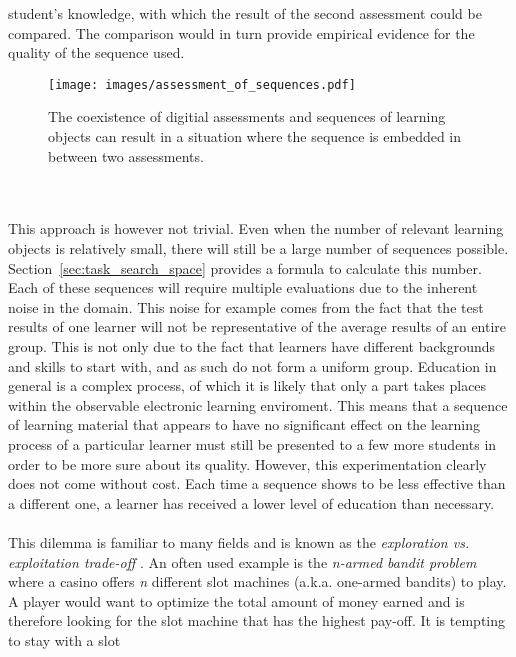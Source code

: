 student's knowledge, with which the result of the second assessment could be
compared. The comparison would in turn provide empirical evidence for the
quality of the sequence used.
\begin{figure}[h!]
	\begin{framed}
	\centering
	\texttt{[image: images/assessment\_of\_sequences.pdf]}
	\caption[Coexistence of learning objects and assessments]{The coexistence of digitial assessments and sequences of learning
	objects can result in a situation where the sequence is embedded in between
	two assessments.}
	\label{fig:assessment_of_sequences}
	\end{framed}
\end{figure}\\\\
\noindent
This approach is however not trivial. Even when the number of relevant learning
objects is relatively small, there will still be a large number of sequences
possible. Section~\ref{sec:task_search_space} provides a formula to calculate
this number. Each of these sequences will require multiple evaluations due to
the inherent noise in the domain. This noise for example comes from the fact
that the test results of one learner will not be representative of the average
results of an entire group. This is not only due to the fact that learners have
different backgrounds and skills to start with, and as such do not form a
uniform group. Education in general is a complex process, of which it is likely
that only a part takes places within the observable electronic learning
enviroment. This means that a sequence of learning material that appears to
have no significant effect on the learning process of a particular learner must
still be presented to a few more students in order to be more sure about its
quality. However, this experimentation clearly does not come without cost. Each
time a sequence shows to be less effective than a different one, a learner has
received a lower level of education than necessary.\\\\
\noindent
This dilemma is familiar to many fields and is known as the \emph{exploration
vs. exploitation trade-off} \citep{Holland1992}. An often used example is the
\emph{n-armed bandit problem} \citep{Sutton1998} where a casino offers \emph{n}
different slot machines (a.k.a. one-armed bandits) to play. A player would want to
optimize the total amount of money earned and is therefore looking for the slot
machine that has the highest pay-off. It is tempting to stay with a slot
